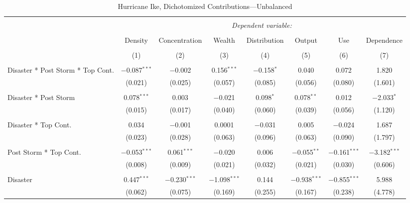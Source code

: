 
\begin{table}[!htbp] \centering 
  \caption{Hurricane Ike, Dichotomized Contributions---Unbalanced} 
  \label{} 
\footnotesize 
\begin{tabular}{@{\extracolsep{5pt}}lccccccc} 
\\[-1.8ex]\hline 
\hline \\[-1.8ex] 
 & \multicolumn{7}{c}{\textit{Dependent variable:}} \\ 
\cline{2-8} 
\\[-1.8ex] & Density & Concentration & Wealth & Distribution & Output & Use & Dependence \\ 
\\[-1.8ex] & (1) & (2) & (3) & (4) & (5) & (6) & (7)\\ 
\hline \\[-1.8ex] 
 Disaster * Post Storm * Top Cont. & $-$0.087$^{***}$ & $-$0.002 & 0.156$^{***}$ & $-$0.158$^{*}$ & 0.040 & 0.072 & 1.820 \\ 
  & (0.021) & (0.025) & (0.057) & (0.085) & (0.056) & (0.080) & (1.601) \\ 
  & & & & & & & \\ 
 Disaster * Post Storm & 0.078$^{***}$ & 0.003 & $-$0.021 & 0.098$^{*}$ & 0.078$^{**}$ & 0.012 & $-$2.033$^{*}$ \\ 
  & (0.015) & (0.017) & (0.040) & (0.060) & (0.039) & (0.056) & (1.120) \\ 
  & & & & & & & \\ 
 Disaster * Top Cont. & 0.034 & $-$0.001 & 0.0001 & $-$0.031 & 0.005 & $-$0.024 & 1.687 \\ 
  & (0.023) & (0.028) & (0.063) & (0.096) & (0.063) & (0.090) & (1.797) \\ 
  & & & & & & & \\ 
 Post Storm *  Top Cont. & $-$0.053$^{***}$ & 0.061$^{***}$ & $-$0.020 & 0.006 & $-$0.055$^{**}$ & $-$0.161$^{***}$ & $-$3.182$^{***}$ \\ 
  & (0.008) & (0.009) & (0.021) & (0.032) & (0.021) & (0.030) & (0.606) \\ 
  & & & & & & & \\ 
 Disaster & 0.447$^{***}$ & $-$0.230$^{***}$ & $-$1.098$^{***}$ & 0.144 & $-$0.938$^{***}$ & $-$0.855$^{***}$ & 5.988 \\ 
  & (0.062) & (0.075) & (0.169) & (0.255) & (0.167) & (0.238) & (4.778) \\ 

\end{tabular}
\end{table}
